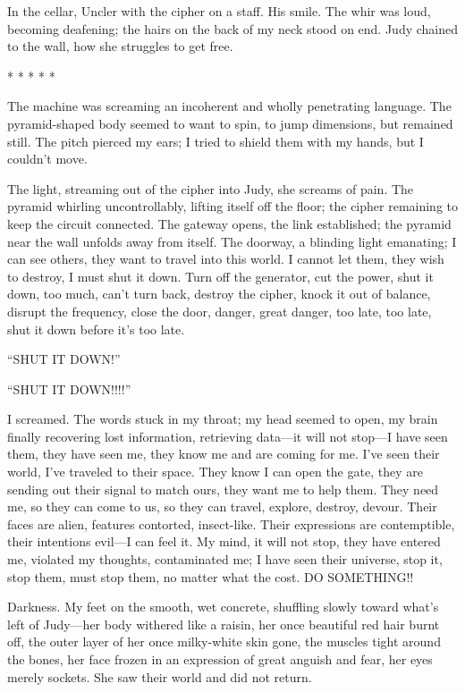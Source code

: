 In the cellar, Uncler with the cipher on a staff. His smile. The whir
was loud, becoming deafening; the hairs on the back of my neck stood on
end. Judy chained to the wall, how she struggles to get free.

* * * * *

The machine was screaming an incoherent and wholly penetrating language.
The pyramid-shaped body seemed to want to spin, to jump dimensions, but
remained still. The pitch pierced my ears; I tried to shield them with
my hands, but I couldn't move.

The light, streaming out of the cipher into Judy, she screams of pain.
The pyramid whirling uncontrollably, lifting itself off the floor; the
cipher remaining to keep the circuit connected. The gateway opens, the
link established; the pyramid near the wall unfolds away from itself.
The doorway, a blinding light emanating; I can see others, they want to
travel into this world. I cannot let them, they wish to destroy, I must
shut it down. Turn off the generator, cut the power, shut it down, too
much, can't turn back, destroy the cipher, knock it out of balance,
disrupt the frequency, close the door, danger, great danger, too late,
too late, shut it down before it's too late.

``SHUT IT DOWN!''

``SHUT IT DOWN!!!!''

I screamed. The words stuck in my throat; my head seemed to open, my
brain finally recovering lost information, retrieving data---it will not
stop---I have seen them, they have seen me, they know me and are coming
for me. I've seen their world, I've traveled to their space. They know I
can open the gate, they are sending out their signal to match ours, they
want me to help them. They need me, so they can come to us, so they can
travel, explore, destroy, devour. Their faces are alien, features
contorted, insect-like. Their expressions are contemptible, their
intentions evil---I can feel it. My mind, it will not stop, they have
entered me, violated my thoughts, contaminated me; I have seen their
universe, stop it, stop them, must stop them, no matter what the cost.
DO SOMETHING!!

Darkness. My feet on the smooth, wet concrete, shuffling slowly toward
what's left of Judy---her body withered like a raisin, her once
beautiful red hair burnt off, the outer layer of her once milky-white
skin gone, the muscles tight around the bones, her face frozen in an
expression of great anguish and fear, her eyes merely sockets. She saw
their world and did not return.

